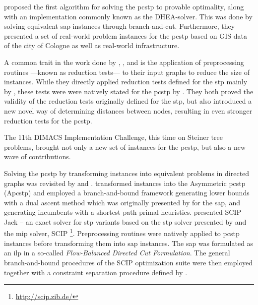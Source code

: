  \citet{ljubic2005solving} proposed the first algorithm for solving the \gls{pcstp} to provable optimality, along with an
 implementation commonly known as the DHEA-solver.
 This was done by solving
 equivalent \gls{sap} instances through branch-and-cut.
 Furthermore, they presented a set of real-world problem instances for the \gls{pcstp} based on GIS data of the
 city of Cologne as well as real-world infrastructure.

 A common trait in the work done by
 \citet{lucena2004strong}, \citet{Ljubic:2004:memetic}, and \citet{ljubic2005solving}
 is the application of preprocessing routines
  ---known as reduction tests--- to their input graphs to reduce the size of instances.
  While they directly applied reduction tests
  defined for the \gls{stp} mainly by \citet{duin1989edge,duin1989reduction},
  these tests were were natively stated for the \gls{pcstp}
  by \citet{uchoa2006reduction}.
  They both proved the validity
  of the reduction tests originally defined for the \gls{stp},
  but also introduced a new
  novel way of determining distances between nodes, resulting in
  even stronger reduction tests for the \gls{pcstp}.

  \medskip
  The 11th DIMACS Implementation Challenge\citep{DIMACS}, this time on Steiner tree problems,
  brought not only a new set of instances for the \gls{pcstp}, but
  also a new wave of contributions.

  Solving the \gls{pcstp} by transforming instances into equivalent problems in directed graphs
  was revisited by \citet{leitner2016dual} and \citet{gamrath2017scip}.
  \citet{leitner2016dual} transformed instances into the Asymmetric \gls{pcstp} (A\gls{pcstp})
  and employed a
  branch-and-bound framework generating lower bounds with a dual ascent method which was originally presented by \citet{wong1984dual} for the \gls{sap}, and
  generating incumbents with
  a shortest-path primal heuristics.
  \citet{gamrath2017scip} presented SCIP Jack -- an exact solver for \gls{stp} variants based on the \gls{stp} solver presented by
  \citet{koch1998solving} and the \gls{mip} solver, SCIP \footnote{\url{http://scip.zib.de/}}\citep{GleixnerEtal2017OO}.
  Preprocessing routines were natively applied to \gls{pcstp} instances before transforming them into \gls{sap} instances.
  The \gls{sap} was formulated as an
  \gls{ilp} in a so-called \textit{Flow-Balanced Directed Cut Formulation}. The general branch-and-bound
  procedures of the SCIP optimization suite were
  then employed together with a constraint separation procedure defined by \citet{koch1998solving}.

